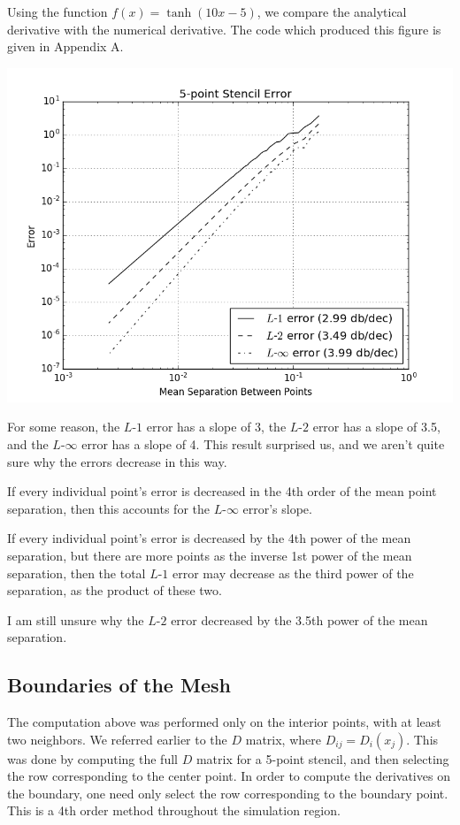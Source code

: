 \documentclass{article}
\begin{document}
Using the function $f(x) = \tanh ( 10 x - 5 )$, we compare the analytical
	derivative with the numerical derivative.
The code which produced this figure is given in Appendix A.

\includegraphics[width=\textwidth]{ErrorDecrease.png}

For some reason, the $L$-$1$ error has a slope of 3,
	the $L$-$2$ error has a slope of 3.5,
	and the $L$-$\infty$ error has a slope of 4.
This result surprised us, and we aren't quite sure why the errors
	decrease in this way.

If every individual point's error is decreased in the 4th order
	of the mean point separation, then this accounts for the
	$L$-$\infty$ error's slope.

If every individual point's error is decreased by the 4th power
	of the mean separation, but there are more points as the inverse
	1st power of the mean separation, then the total $L$-$1$ error
	may decrease as the third power of the separation, as the product
	of these two.

I am still unsure why the $L$-$2$ error decreased by the 3.5th
	power of the mean separation.

\subsection{Boundaries of the Mesh}

The computation above was performed only on the interior points,
	with at least two neighbors.
We referred earlier to the $D$ matrix, where $D_{ij} = D_i(x_j)$.
This was done by computing the full $D$ matrix for a 5-point stencil,
	and then selecting the row corresponding to the center point.
In order to compute the derivatives on the boundary, one need only select
	the row corresponding to the boundary point.
This is a 4th order method throughout the simulation region.
\end{document}
